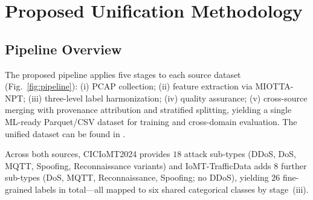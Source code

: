 \documentclass[runningheads]{llncs}
\begin{document}
\section{Proposed Unification Methodology}
\label{sec:methodology}

\subsection{Pipeline Overview}

The proposed pipeline applies five stages to each source dataset (Fig.~\ref{fig:pipeline}): (i) PCAP collection; (ii) feature extraction via MIOTTA-NPT; (iii) three-level label harmonization; (iv) quality assurance; (v) cross-source merging with provenance attribution and stratified splitting, yielding a single ML-ready Parquet/CSV dataset for training and cross-domain evaluation. The unified dataset can be found in \cite{pantelis2026_unified_dataset}.

Across both sources, CICIoMT2024 provides $18$ attack sub-types (DDoS, DoS, MQTT, Spoofing, Reconnaissance variants) and IoMT-TrafficData adds $8$ further sub-types (DoS, MQTT, Reconnaissance, Spoofing; no DDoS), yielding $26$ fine-grained labels in total---all mapped to six shared categorical classes by stage~(iii).
\end{document}
